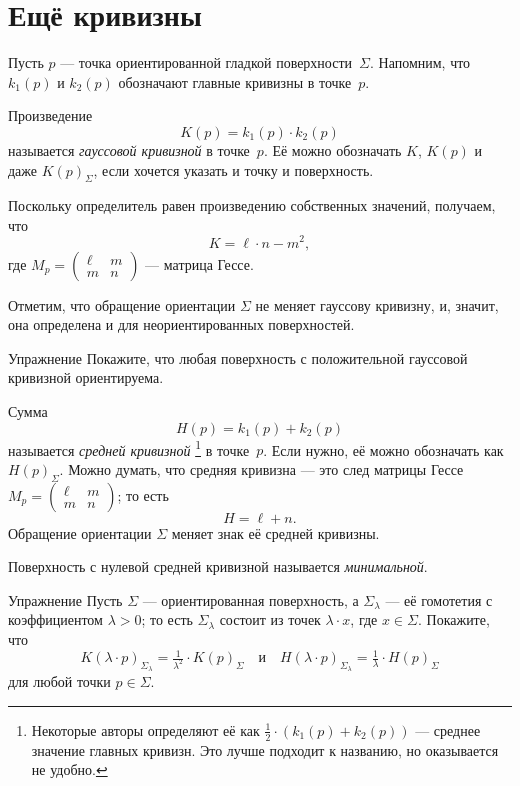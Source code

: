 \section{Ещё кривизны}\label{sec:More curvatures}

Пусть $p$ --- точка ориентированной гладкой поверхности~$\Sigma$.
Напомним, что $k_1(p)$ и $k_2(p)$ обозначают главные кривизны в точке~$p$.

Произведение 
\[K(p)=k_1(p)\cdot k_2(p)\]
называется \emph{гауссовой кривизной} в точке~$p$.
Её можно обозначать $K$, $K(p)$ и даже $K(p)_\Sigma$, если хочется указать и точку и поверхность.

Поскольку определитель равен произведению собственных значений, получаем, что
\[K=\ell\cdot n-m^2,\]
где 
$M_p=
(\begin{smallmatrix}
\ell&m
\\
m&n
\end{smallmatrix}
)$
--- матрица Гессе.

Отметим, что обращение ориентации $\Sigma$ не меняет гауссову кривизну,
и, значит, она определена и для неориентированных поверхностей.

\begin{thm}{Упражнение}\label{ex:gauss+orientable}
Покажите, что любая поверхность с положительной гауссовой кривизной ориентируема. 
\end{thm}

Сумма 
\[H(p)=k_1(p)+ k_2(p)\] 
называется \emph{средней кривизной}%
\footnote{Некоторые авторы определяют её как $\tfrac12\cdot(k_1(p)+ k_2(p))$ --- среднее значение главных кривизн.
Это лучше подходит к названию, но оказывается не удобно.}
в точке~$p$.
Если нужно, её можно обозначать как $H(p)_\Sigma$.
Можно думать, что средняя кривизна --- это след матрицы Гессе $M_p=
(\begin{smallmatrix}
\ell&m
\\
m&n
\end{smallmatrix}
)$;
то есть
\[H=\ell+n.\] 
Обращение ориентации $\Sigma$ меняет знак её средней кривизны.

Поверхность с нулевой средней кривизной называется \emph{минимальной}.

\begin{thm}{Упражнение}\label{ex:re-scale-surface-curvature}
Пусть $\Sigma$ --- ориентированная поверхность, а $\Sigma_{\lambda}$ --- её гомотетия с коэффициентом $\lambda > 0$; то есть $\Sigma_{\lambda}$ состоит из точек $\lambda \cdot x$, где $x \in \Sigma$.
Покажите, что
\[K(\lambda\cdot p)_{\Sigma_{\lambda}}
= \tfrac{1}{\lambda^2}\cdot K(p)_{\Sigma}
\quad\text{и}\quad
H(\lambda \cdot p)_{\Sigma_{\lambda}} = \tfrac1\lambda\cdot H(p)_{\Sigma}\]
для любой точки $p\in \Sigma$.  
\end{thm}


